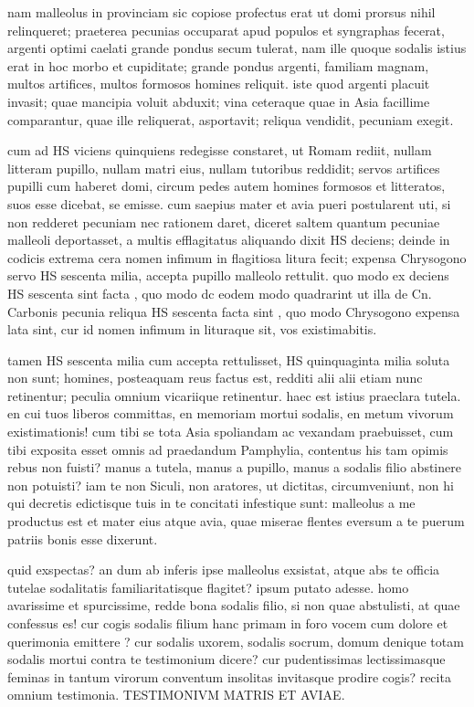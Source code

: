 nam malleolus in provinciam sic copiose profectus erat ut domi prorsus nihil relinqueret; praeterea pecunias occuparat apud populos et syngraphas fecerat, argenti optimi caelati grande pondus secum tulerat, nam ille quoque sodalis istius erat in hoc morbo et cupiditate; grande pondus argenti, familiam magnam, multos artifices, multos formosos homines reliquit. iste quod argenti placuit invasit; quae mancipia voluit abduxit; vina ceteraque quae in Asia facillime comparantur, quae ille reliquerat, asportavit; reliqua vendidit, pecuniam exegit.

 cum ad HS viciens quinquiens redegisse constaret, ut Romam rediit, nullam litteram pupillo, nullam matri eius, nullam tutoribus reddidit; servos artifices pupilli cum haberet domi, circum pedes autem homines formosos et litteratos, suos esse dicebat, se emisse. cum saepius mater et avia pueri postularent uti, si non redderet pecuniam nec rationem daret, diceret saltem quantum pecuniae malleoli deportasset, a multis efflagitatus aliquando dixit HS deciens; deinde in codicis extrema cera nomen infimum in flagitiosa litura fecit; expensa Chrysogono servo HS sescenta milia, accepta pupillo malleolo rettulit. quo modo ex deciens HS sescenta sint facta , quo modo dc eodem modo quadrarint ut illa de Cn. Carbonis pecunia reliqua HS sescenta facta sint , quo modo Chrysogono expensa lata sint, cur id nomen infimum in lituraque sit, vos existimabitis.

 tamen HS sescenta milia cum accepta rettulisset, HS quinquaginta milia soluta non sunt; homines, posteaquam reus factus est, redditi alii alii etiam nunc retinentur; peculia omnium vicariique retinentur. haec est istius praeclara tutela. en cui tuos liberos committas, en memoriam mortui sodalis, en metum vivorum existimationis! cum tibi se tota Asia spoliandam ac vexandam praebuisset, cum tibi exposita esset omnis ad praedandum Pamphylia, contentus his tam opimis rebus non fuisti? manus a tutela, manus a pupillo, manus a sodalis filio abstinere non potuisti? iam te non Siculi, non aratores, ut dictitas, circumveniunt, non hi qui decretis edictisque tuis in te concitati infestique sunt: malleolus a me productus est et mater eius atque avia, quae miserae flentes eversum a te puerum patriis bonis esse dixerunt.

 quid exspectas? an dum ab inferis ipse malleolus exsistat, atque abs te officia tutelae sodalitatis familiaritatisque flagitet? ipsum putato adesse. homo avarissime et spurcissime, redde bona sodalis filio, si non quae abstulisti, at quae confessus es! cur cogis sodalis filium hanc primam in foro vocem cum dolore et querimonia emittere ? cur sodalis uxorem, sodalis socrum, domum denique totam sodalis mortui contra te testimonium dicere? cur pudentissimas lectissimasque feminas in tantum virorum conventum insolitas invitasque prodire cogis? recita omnium testimonia. TESTIMONIVM MATRIS ET AVIAE.

